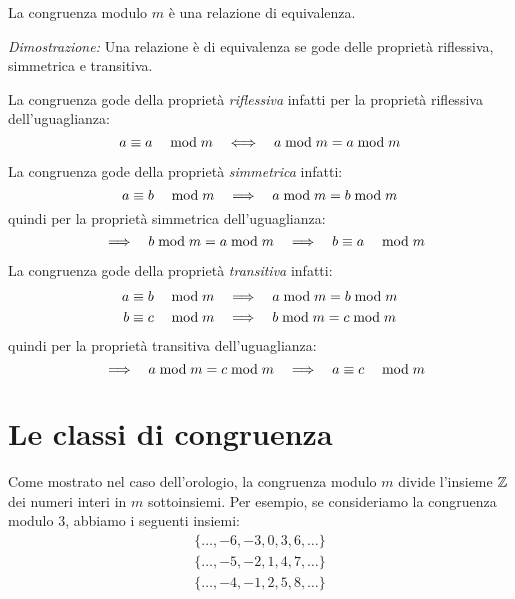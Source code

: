     \begin{teorema}
        La congruenza modulo $m$ è una relazione di equivalenza.
    \end{teorema}
    \begin{dimostrazione}
        \emph{Dimostrazione: }
        Una relazione è di equivalenza se gode delle proprietà riflessiva, simmetrica e transitiva.

        La congruenza gode della proprietà \emph{riflessiva} infatti per la proprietà riflessiva dell'uguaglianza:
        \begin{equation*}
             a \equiv a \quad\bmod m   \quad\Longleftrightarrow\quad  a  \bmod  m = a  \bmod  m
        \end{equation*}
        
        La congruenza gode della proprietà \emph{simmetrica} infatti:
        \begin{equation*}            
             a \equiv b \quad\bmod m   \quad\Longrightarrow\quad  a  \bmod  m = b  \bmod  m 
        \end{equation*}
        quindi per la proprietà simmetrica dell'uguaglianza:
        \begin{equation*}
             \quad\Longrightarrow\quad  b  \bmod  m = a  \bmod  m  \quad\Longrightarrow\quad   b \equiv a \quad\bmod m 
        \end{equation*}
        
        La congruenza gode della proprietà \emph{transitiva} infatti:
        \begin{gather*}
             a \equiv b \quad\bmod m   \quad\Longrightarrow\quad  a  \bmod  m = b  \bmod  m \\
             b \equiv c \quad\bmod m   \quad\Longrightarrow\quad  b  \bmod  m = c  \bmod  m
        \end{gather*}
        quindi per la proprietà transitiva dell'uguaglianza:
        \begin{equation*}
             \quad\Longrightarrow\quad  a  \bmod  m = c  \bmod  m  \quad\Longrightarrow\quad   a \equiv c \quad\bmod m 
        \end{equation*}
    \end{dimostrazione}

\section{Le classi di congruenza}

Come mostrato nel caso dell'orologio, la congruenza modulo $m$ divide l'insieme $ \mathbb{Z} $ dei numeri interi in $m$ sottoinsiemi. Per esempio, se consideriamo la congruenza modulo 3, abbiamo i seguenti insiemi:
\begin{gather*}
    \{\dots, -6, -3, 0, 3, 6, \dots\} \\
    \{\dots, -5, -2, 1, 4, 7, \dots\} \\
    \{\dots, -4, -1, 2, 5, 8, \dots\}
\end{gather*}

